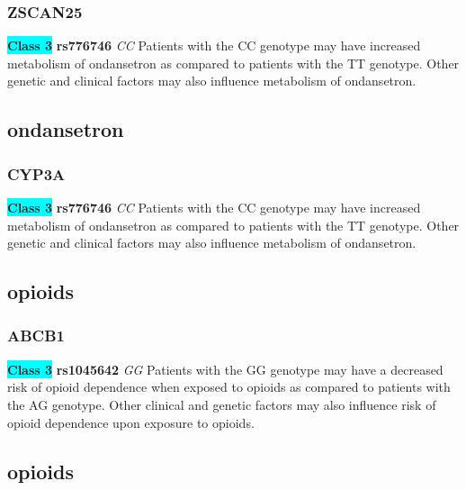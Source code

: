 \documentclass{book}
\begin{document}
\subsubsection{ ZSCAN25 }

\begin{center}
\textbf{\colorbox{cyan} {Class 3}} \textbf{ rs776746 } \textit{ CC }
Patients with the CC genotype may have increased metabolism of ondansetron as compared to patients with the TT genotype. Other genetic and clinical factors may also influence metabolism of ondansetron.


\end{center}\subsection{ ondansetron }


\subsubsection{ CYP3A }

\begin{center}
\textbf{\colorbox{cyan} {Class 3}} \textbf{ rs776746 } \textit{ CC }
Patients with the CC genotype may have increased metabolism of ondansetron as compared to patients with the TT genotype. Other genetic and clinical factors may also influence metabolism of ondansetron.


\end{center}\subsection{ opioids }


\subsubsection{ ABCB1 }

\begin{center}
\textbf{\colorbox{cyan} {Class 3}} \textbf{ rs1045642 } \textit{ GG }
Patients with the GG genotype may have a decreased risk of opioid dependence when exposed to opioids as compared to patients with the AG genotype. Other clinical and genetic factors may also influence risk of opioid dependence upon exposure to opioids. 


\end{center}\subsection{ opioids }
\end{document}
